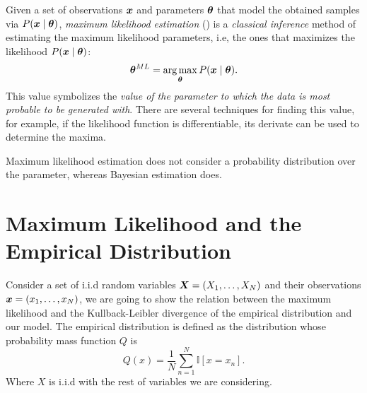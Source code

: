 
Given a set of observations \(\bm{x}\) and parameters \(\bm{\theta}\) that model the obtained samples via \(P(\bm{x} \mid \bm{\theta})\), \emph{maximum likelihood estimation} (\cite{rossi2018mathematical}) is a \emph{classical inference} method of estimating the maximum likelihood parameters, i.e, the ones that maximizes the likelihood \(P(\bm{x} \mid \bm{\theta})\):
  \[
    \bm{\theta}^{ML} = \operatorname*{arg\,max}_{\bm{\theta}} P(\bm{x} \mid \bm{\theta}).
  \]
  This value symbolizes the \emph{value of the parameter to which the data is most probable to be generated with}. There are several techniques for finding this value, for example, if the likelihood function is differentiable, its derivate can be used to determine the maxima.

  \begin{remark}
    Maximum likelihood estimation does not consider a probability distribution over the parameter, whereas Bayesian estimation does.
  \end{remark}

\section{Maximum Likelihood and the Empirical Distribution}

Consider a set of i.i.d random variables \(\bm{X} = (X_{1},\dots, X_{N})\) and their observations \(\bm{x} = (x_{1},\dots,x_{N})\), we are going to show the relation between the maximum likelihood and the Kullback-Leibler divergence of the empirical distribution and our model. The empirical distribution is defined as the distribution whose probability mass function \(Q\) is
\[
  Q(x) = \frac{1}{N}\sum_{n = 1}^N \mathbb{I}[x = x_n].
\]
Where \(X\) is i.i.d with the rest of variables we are considering.

